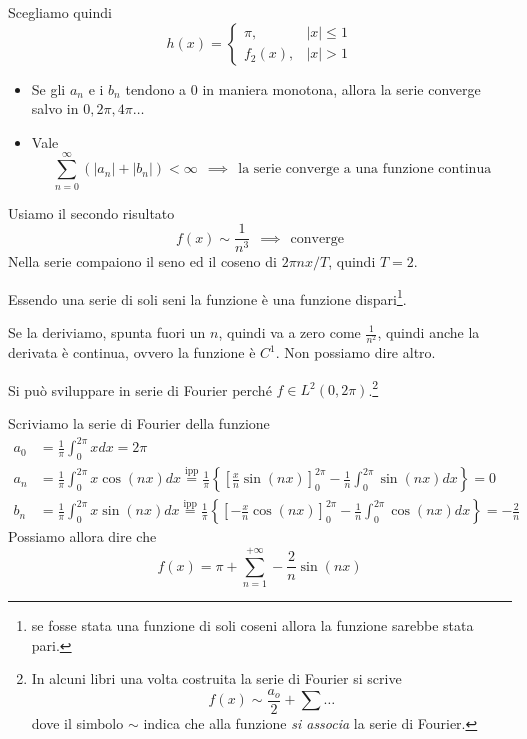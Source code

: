 Scegliamo quindi
\begin{equation*}
h(x) =
\begin{cases}
\pi, & |x| \leq 1\\
f_{2} (x), & |x| > 1
\end{cases}
\end{equation*}

\Soluzione

\begin{itemize}
\item Se gli $a_{n}$ e i $b_{n}$ tendono a $0$ in maniera monotona, allora la serie converge salvo in $0, 2\pi, 4\pi \dotsc $
\item Vale
\begin{equation*}
\sum\limits^{\infty}_{n = 0}(| a_{n}| + | b_{n}|) < \infty \ \ \implies \ \ \text{la serie converge a una funzione continua}
\end{equation*}
\end{itemize}

Usiamo il secondo risultato
\begin{equation*}
f(x) \sim \frac{1}{n^{3}} \ \ \implies \ \ \text{converge}
\end{equation*}
Nella serie compaiono il seno ed il coseno di $2\pi nx/T$, quindi $T = 2$.

Essendo una serie di soli seni la funzione è una funzione dispari\footnote{se fosse stata una funzione di soli coseni allora la funzione sarebbe stata pari.}.

Se la deriviamo, spunta fuori un $n$, quindi va a zero come $\frac{1}{n^{2}}$, quindi anche la derivata è continua, ovvero la funzione è $C^{1}$. Non possiamo dire altro.

\Soluzione

Si può sviluppare in serie di Fourier perché $f\in L^{2}(0, 2\pi)$.\footnote{In alcuni libri una volta costruita la serie di Fourier si scrive
\begin{equation*}
f(x)\sim \frac{a_{o}}{2} + \sum \ldots
\end{equation*}
dove il simbolo $\sim $ indica che alla funzione \textit{si associa} la serie di Fourier.}

Scriviamo la serie di Fourier della funzione
\begin{equation*}
\begin{aligned}
a_{0} & = \frac{1}{\pi}\int^{2\pi}_{0} xdx = 2\pi \\
a_{n} & = \frac{1}{\pi}\int^{2\pi}_{0} x\cos (nx)dx\overset{\text{ipp}}{=}\frac{1}{\pi}\left\{\left[\frac{x}{n}\sin (nx)\right]^{2\pi}_{0} - \frac{1}{n}\int^{2\pi}_{0}\sin (nx)dx\right\} = 0\\
b_{n} & = \frac{1}{\pi}\int^{2\pi}_{0} x\sin (nx)dx\overset{\text{ipp}}{=}\frac{1}{\pi}\left\{\left[ - \frac{x}{n}\cos (nx)\right]^{2\pi}_{0} - \frac{1}{n}\int^{2\pi}_{0}\cos (nx)dx\right\} = - \frac{2}{n}
\end{aligned}
\end{equation*}
Possiamo allora dire che
\begin{equation*}
f(x) = \pi + \sum^{+ \infty}_{n = 1} - \frac{2}{n}\sin (nx)
\end{equation*}

